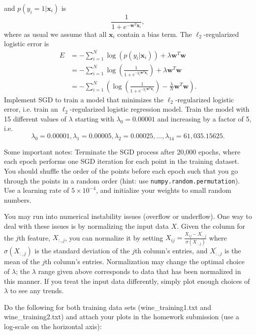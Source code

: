 and $p(y_i = 1 | \mathbf{x}_i)$ is
\[\frac{1}{1 + e^{-\mathbf{w}^T\mathbf{x}_i}},\]
where as usual we assume that all $\mathbf{x}_i$ contain a bias term.
The $\ell_2$-regularized logistic error is 
\begin{align*}
  E &= -\sum_{i=1}^{N}\log(p(y_i | \mathbf{x}_i)) + \lambda\mathbf{w}^T\mathbf{w} \\
    &= -\sum_{i=1}^{N} \log \left( \frac{1}{1 + e^{-y_i\mathbf{w}^T\mathbf{x}_i}} \right) + \lambda\mathbf{w}^T\mathbf{w} \\
    &= -\sum_{i=1}^{N} \left(\log \left( \frac{1}{1 + e^{-y_i\mathbf{w}^T\mathbf{x}_i}} \right) - \frac{\lambda}{N}\mathbf{w}^T\mathbf{w}\right).
\end{align*}
Implement SGD to train a model that minimizes the $\ell_2$-regularized logistic error, i.e. train an $\ell_2$-regularized logistic regression model.  Train the model with 15 different values of $\lambda$ starting with $\lambda_0 = 0.00001$ and increasing by a factor of 5, i.e. $$\lambda_0 = 0.00001, \lambda_1 = 0.00005, \lambda_2 = 0.00025, ..., \lambda_{14} = 61,035.15625.$$
\par

Some important notes: Terminate the SGD process after 20,000 epochs, where each epoch performs one SGD iteration for each point in the training dataset. You should shuffle the order of the points before each epoch such that you go through the points in a random order (hint: use \texttt{numpy.random.permutation}). Use a learning rate of $5 \times 10^{-4}$, and initialize your weights to small random numbers. 

You may run into numerical instability issues (overflow or underflow). One way to deal with these issues is by normalizing the input data $X$. Given the column for the $j$th feature, $X_{:,j}$, you can normalize it by setting $X_{ij} = \frac{X_{ij} - \overline{X_{:,j}} }{\sigma(X_{:,j})}$ where $\sigma(X_{:,j})$ is the standard deviation of the $j$th column's entries, and $\overline{X_{:,j}}$ is the mean of the $j$th column's entries. Normalization may change the optimal choice of $\lambda$; the $\lambda$ range given above corresponds to data that has been normalized in this manner. If you treat the input data differently, simply plot enough choices of $\lambda$ to see any trends.

\problem[16]
Do the following for both training data sets (wine\_training1.txt and wine\_training2.txt) and attach your plots in the homework submission (use a log-scale on the horizontal axis):

